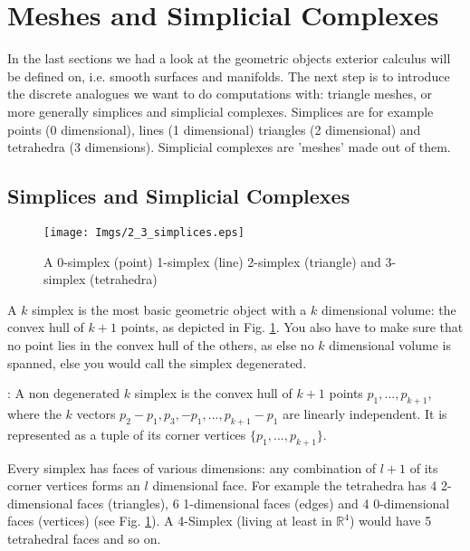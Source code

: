 \newpage
\section{Meshes and Simplicial Complexes}
\label{sec::2_discreteManifolds}
In the last sections we had a look at the geometric objects exterior calculus will be defined on, i.e. smooth surfaces and manifolds. The next step is to introduce the discrete analogues we want to do computations with: triangle meshes, or more generally simplices and simplicial complexes. Simplices are for example points (0 dimensional), lines (1 dimensional) triangles (2 dimensional) and tetrahedra (3 dimensions). Simplicial complexes are 'meshes' made out of them.

\subsection{Simplices and Simplicial Complexes}

\begin{figure}[b]
\begin{center}
\texttt{[image: Imgs/2\_3\_simplices.eps]}
\end{center}
\caption{A 0-simplex (point) 1-simplex (line) 2-simplex (triangle) and 3-simplex (tetrahedra) }
\label{fig::2_3_simplices}
\end{figure}

A $k$ simplex is the most basic geometric object with a $k$ dimensional volume: the convex hull of $k+1$ points, as depicted in Fig. \ref{fig::2_3_simplices}. You also have to make sure that no point lies in the convex hull of the others, as else no $k$ dimensional volume is spanned, else you would call the simplex degenerated.

\begin{definition}[Simplex]: A non degenerated $k$ simplex is the convex hull of $k + 1$ points $p_1,...,p_{k+1}$, where the $k$ vectors $p_2 -p_1, p_3,-p_1, ..., p_{k+1} -p_1$ are linearly independent. It is represented as a tuple of its corner vertices $\{p_1,...,p_{k+1}\}$.
\end{definition}

Every simplex has faces of various dimensions: any combination of $l+1$ of its corner vertices forms an $l$ dimensional face. For example the tetrahedra has 4 2-dimensional faces (triangles), 6 1-dimensional faces (edges) and 4 0-dimensional faces (vertices) (see Fig. \ref{fig::2_3_simplices}). A 4-Simplex (living at least in $\mathbb R^4$) would have 5 tetrahedral faces and so on.

